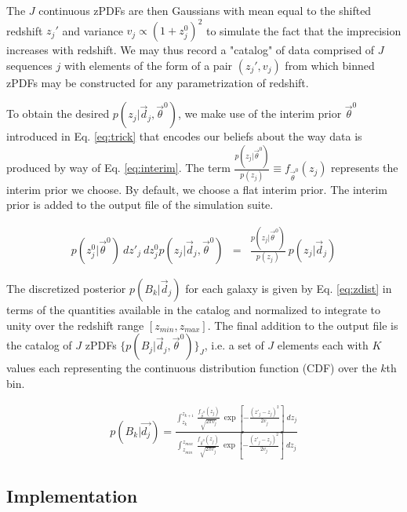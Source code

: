 \documentclass[preprint]{aastex}
\begin{document}
The $J$ continuous zPDFs are then Gaussians with mean equal to the shifted 
redshift $z_{j}'$ and variance $v_{j}\propto(1+z_{j}^{0})^{2}$ to simulate the 
fact that the imprecision increases with redshift.  We may thus record a 
"catalog" of data comprised of $J$ sequences $j$ with elements of the form of a 
pair $(z_{j}',v_{j})$ from which binned zPDFs may be constructed for any 
parametrization of redshift.  

To obtain the desired $p(z_{j}|\vec{d}_{j},\vec{\theta}^{0})$, we make use of 
the interim prior $\vec{\theta}^{0}$ introduced in Eq. \ref{eq:trick} that 
encodes our beliefs about the way data is produced by way of Eq. 
\ref{eq:interim}.  The term $\frac{p(z_{j}|\vec{\theta}^{0})}{p(z_{j})}\equiv 
f_{\vec{\theta}^{0}}(z_{j})$ represents the interim prior we choose.  By 
default, we choose a flat interim prior.  The interim prior is added to the 
output file of the simulation suite.  

\begin{eqnarray}
\label{eq:interim}
p(z^{0}_{j}|\vec{\theta}^{0})\ dz'_{j}\ dz^{0}_{j}
p(z_{j}|\vec{d}_{j},\vec{\theta}^{0}) &=& 
\frac{p(z_{j}|\vec{\theta}^{0})}{p(z_{j})}\ p(z_{j}|\vec{d}_{j})
\end{eqnarray}

The discretized posterior $p(B_{k}|\vec{d}_{j})$ for each galaxy is given by 
Eq. \ref{eq:zdist} in terms of the quantities available in the catalog and 
normalized to integrate to unity over the redshift range $[z_{min},z_{max}]$.  
The final addition to the output file is the catalog of $J$ zPDFs 
$\{p(B_{j}|\vec{d}_{j},\vec{\theta}^{0})\}_{J}$, i.e. a set of $J$ elements 
each with $K$ values each representing the continuous distribution function 
(CDF) over the $k$th bin.

\begin{eqnarray}
\label{eq:zdist}
p(B_{k}|\vec{d_{j}}) = \frac{\int_{z_{k}}^{z_{k+1}}\ 
\frac{f_{\vec{\theta}^{0}}(z_{j})}{\sqrt{2\pi v_{j}}}\ 
\exp\left[-\frac{(z'_{j}-z_{j})^{2}}{2v_{j}}\right]\ 
dz_{j}}{\int_{z_{min}}^{z_{max}}\ \frac{f_{\vec{\theta}^{0}}(z_{j})}{\sqrt{2\pi 
v_{j}}}\ \exp\left[-\frac{(z'_{j}-z_{j})^{2}}{2v_{j}}\right]\ dz_{j}}
\end{eqnarray}

\clearpage
\subsection{Implementation}
\label{sec:mcmc}
\end{document}
